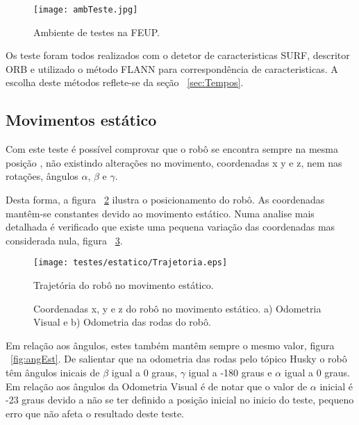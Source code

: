 \begin{figure}[h!] 
	\begin{center}
		\leavevmode		
		\texttt{[image: ambTeste.jpg]}
		\caption{Ambiente de testes na FEUP.}
		\label{fig:ambTeste}
	\end{center}
\end{figure}


Os teste foram todos realizados com o detetor de caracteristicas SURF, descritor ORB e utilizado o método FLANN para correspondência de caracteristicas. A escolha deste métodos reflete-se da seção ~\ref{sec:Tempos}.


\subsection{Movimentos estático}\label{subsubsection:Estatico}

Com este teste é possível comprovar que o robô se encontra sempre na mesma posição , não existindo alterações no movimento, coordenadas x y e z, nem nas rotações, ângulos $\alpha$, $\beta$ e $\gamma$.



Desta forma, a figura ~\ref{fig:trajRoboEst} ilustra o posicionamento do robô. As coordenadas  mantêm-se constantes devido ao movimento estático. Numa analise mais detalhada é verificado que existe uma pequena variação das coordenadas mas considerada nula, figura ~\ref{fig:posEst}.

\pagebreak
\begin{figure}[!htbp]
	\begin{center}
		\leavevmode		
		\texttt{[image: testes/estatico/Trajetoria.eps]}
		\caption{Trajetória do robô no movimento estático.}
		\label{fig:trajRoboEst}
	\end{center}
\end{figure}



\begin{figure}[!htbp]
	\centering
	\qquad
	\caption{Coordenadas x, y e z do robô no movimento estático. a) Odometria Visual e b) Odometria das rodas do robô.}
	\label{fig:posEst}
\end{figure}

Em relação aos ângulos, estes também mantêm sempre o mesmo valor, figura ~\ref{fig:angEst}. De salientar que na odometria das rodas pelo tópico Husky o robô têm ângulos inicais de  $\beta$ igual a 0 graus, $\gamma$ igual a -180 graus e $\alpha$ igual a 0 graus. Em relação aos ângulos da Odometria Visual é de notar que o valor de  $\alpha$ inicial é -23 graus devido a não se ter definido a posição inicial no inicio do teste, pequeno erro que não afeta o resultado deste teste.


